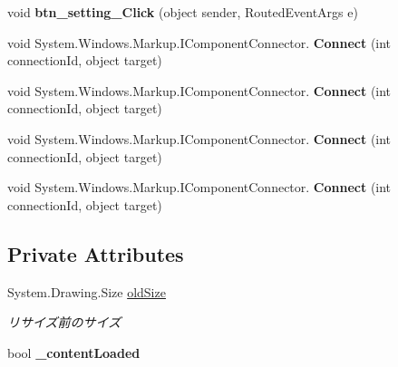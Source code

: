 \begin{DoxyCompactItemize}
void {\bfseries btn\+\_\+setting\+\_\+\+Click} (object sender, Routed\+Event\+Args e)
\item 
\mbox{\label{class_reversi_wpf_1_1_main_window_a829729c0f5b798ad441e8162fb58eb5e}} 
void System.\+Windows.\+Markup.\+I\+Component\+Connector. {\bfseries Connect} (int connection\+Id, object target)
\item 
\mbox{\label{class_reversi_wpf_1_1_main_window_a829729c0f5b798ad441e8162fb58eb5e}} 
void System.\+Windows.\+Markup.\+I\+Component\+Connector. {\bfseries Connect} (int connection\+Id, object target)
\item 
\mbox{\label{class_reversi_wpf_1_1_main_window_a829729c0f5b798ad441e8162fb58eb5e}} 
void System.\+Windows.\+Markup.\+I\+Component\+Connector. {\bfseries Connect} (int connection\+Id, object target)
\item 
\mbox{\label{class_reversi_wpf_1_1_main_window_a829729c0f5b798ad441e8162fb58eb5e}} 
void System.\+Windows.\+Markup.\+I\+Component\+Connector. {\bfseries Connect} (int connection\+Id, object target)
\end{DoxyCompactItemize}
\subsection*{Private Attributes}
\begin{DoxyCompactItemize}
\item 
\mbox{\label{class_reversi_wpf_1_1_main_window_a6a9c6267497b14a7eaf48402b87049a5}} 
System.\+Drawing.\+Size \hyperlink{class_reversi_wpf_1_1_main_window_a6a9c6267497b14a7eaf48402b87049a5}{old\+Size}
\begin{DoxyCompactList}\small\item\em リサイズ前のサイズ \end{DoxyCompactList}\item 
\mbox{\label{class_reversi_wpf_1_1_main_window_afb63727d8f663c926c3eaa13330d9903}} 
bool {\bfseries \+\_\+content\+Loaded}
\end{DoxyCompactItemize}
